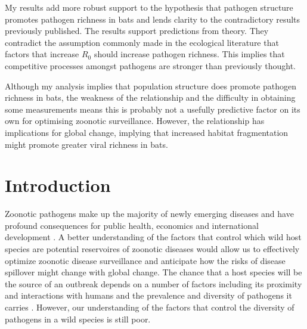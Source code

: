 My results add more robust support to the hypothesis that pathogen structure promotes pathogen richness in bats and lends clarity to the contradictory results previously published.
The results support predictions from theory.
They contradict the assumption commonly made in the ecological literature that factors that increase $R_0$ should increase pathogen richness.
This implies that competitive processes amongst pathogens are stronger than previously thought.



Although my analysis implies that population structure does promote pathogen richness in bats, the weakness of the relationship and the difficulty in obtaining some measurements means this is probably not a usefully predictive factor on its own for optimising zoonotic surveillance.
However, the relationship has implications for global change, implying that increased habitat fragmentation might promote greater viral richness in bats.






\section{Introduction}



Zoonotic pathogens make up the majority of newly emerging diseases and have profound consequences for public health, economics and international development \cite{jones2008global, smith2014global, ebolaWorldbank}.
A better understanding of the factors that control which wild host species are potential reservoires of zoonotic diseases would allow us to effectively optimize zoonotic disease surveillance and anticipate how the risks of disease spillover might change with global change.
The chance that a host species will be the source of an outbreak depends on a number of factors including its proximity and interactions with humans and the prevalence and diversity of pathogens it carries \cite{wolfe2000deforestation}.
However, our understanding of the factors that control the diversity of pathogens in a wild species is still poor.



